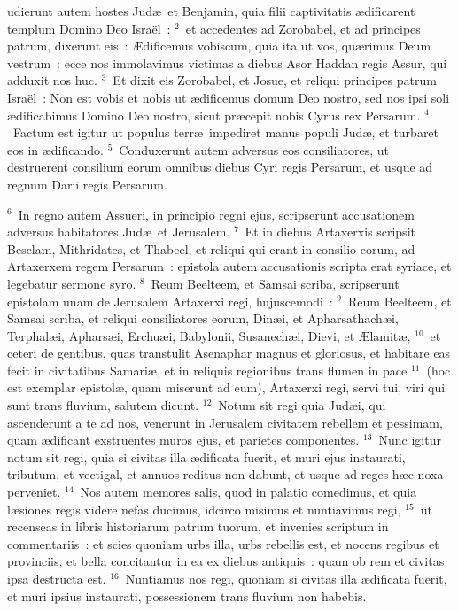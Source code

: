 \bchapter
{}udierunt autem hostes Jud\ae\ et Benjamin, quia filii captivitatis \ae dificarent templum Domino Deo Isra\"el~:
${}^{2}$~et accedentes ad Zorobabel, et ad principes patrum, dixerunt eis~: \AE dificemus vobiscum, quia ita ut vos, qu\ae rimus Deum vestrum~: ecce nos immolavimus victimas a diebus Asor Haddan regis Assur, qui adduxit nos huc.
${}^{3}$~Et dixit eis Zorobabel, et Josue, et reliqui principes patrum Isra\"el~: Non est vobis et nobis ut \ae dificemus domum Deo nostro, sed nos ipsi soli \ae dificabimus Domino Deo nostro, sicut pr\ae cepit nobis Cyrus rex Persarum.
${}^{4}$~Factum est igitur ut populus terr\ae\ impediret manus populi Jud\ae , et turbaret eos in \ae dificando.
${}^{5}$~Conduxerunt autem adversus eos consiliatores, ut destruerent consilium eorum omnibus diebus Cyri regis Persarum, et usque ad regnum Darii regis Persarum.


${}^{6}$~In regno autem Assueri, in principio regni ejus, scripserunt accusationem adversus habitatores Jud\ae\ et Jerusalem.
${}^{7}$~Et in diebus Artaxerxis scripsit Beselam, Mithridates, et Thabeel, et reliqui qui erant in consilio eorum, ad Artaxerxem regem Persarum~: epistola autem accusationis scripta erat syriace, et legebatur sermone syro.
${}^{8}$~Reum Beelteem, et Samsai scriba, scripserunt epistolam unam de Jerusalem Artaxerxi regi, hujuscemodi~:
${}^{9}$~Reum Beelteem, et Samsai scriba, et reliqui consiliatores eorum, Din\ae i, et Apharsathach\ae i, Terphal\ae i, Aphars\ae i, Erchu\ae i, Babylonii, Susanech\ae i, Dievi, et \AE lamit\ae ,
${}^{10}$~et ceteri de gentibus, quas transtulit Asenaphar magnus et gloriosus, et habitare eas fecit in civitatibus Samari\ae , et in reliquis regionibus trans flumen in pace
${}^{11}$~(hoc est exemplar epistol\ae , quam miserunt ad eum), Artaxerxi regi, servi tui, viri qui sunt trans fluvium, salutem dicunt.
${}^{12}$~Notum sit regi quia Jud\ae i, qui ascenderunt a te ad nos, venerunt in Jerusalem civitatem rebellem et pessimam, quam \ae dificant exstruentes muros ejus, et parietes componentes.
${}^{13}$~Nunc igitur notum sit regi, quia si civitas illa \ae dificata fuerit, et muri ejus instaurati, tributum, et vectigal, et annuos reditus non dabunt, et usque ad reges h\ae c noxa perveniet.
${}^{14}$~Nos autem memores salis, quod in palatio comedimus, et quia l\ae siones regis videre nefas ducimus, idcirco misimus et nuntiavimus regi,
${}^{15}$~ut recenseas in libris historiarum patrum tuorum, et invenies scriptum in commentariis~: et scies quoniam urbs illa, urbs rebellis est, et nocens regibus et provinciis, et bella concitantur in ea ex diebus antiquis~: quam ob rem et civitas ipsa destructa est.
${}^{16}$~Nuntiamus nos regi, quoniam si civitas illa \ae dificata fuerit, et muri ipsius instaurati, possessionem trans fluvium non habebis.


